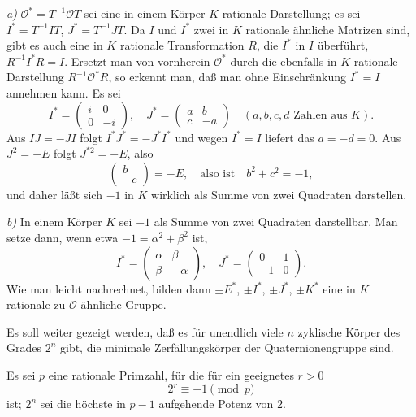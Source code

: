 \documentclass[12pt,a4paper]{article}
\theoremstyle{definition}
\begin{document}
\smallskip

\textit{a)} $\mathcal{O}^* = T^{-1}\mathcal{O}T$ sei eine in einem K\"orper $K$
rationale Darstellung; es sei $I^* = T^{-1}IT$, $J^* = T^{-1}JT$. Da $I$
und $I^*$ zwei in $K$ rationale \"ahnliche Matrizen sind, gibt es auch eine
in $K$ rationale Transformation $R$, die $I^*$ in $I$ \"uberf\"uhrt,
$R^{-1}I^*R = I$. Ersetzt man von vornherein $\mathcal{O}^*$ durch die
ebenfalls in $K$ rationale Darstellung $R^{-1}\mathcal{O}^*R$, so erkennt
man, da\ss{} man ohne Einschr\"ankung $I^* = I$ annehmen kann. Es sei
\[
I^* = \begin{pmatrix} i&0\\0&-i \end{pmatrix}, \quad
J^* = \begin{pmatrix} a&b\\c&-a \end{pmatrix}
\quad (a,b,c,d \text{ Zahlen aus } K).
\]
Aus $IJ = -JI$ folgt $I^*J^* = -J^*I^*$ und wegen $I^* = I$ liefert das
$a = -d = 0$. Aus $J^2 = -E$ folgt $J^{*2} = -E$, also
\[
\begin{pmatrix} b\\-c \end{pmatrix} = -E,
\quad\text{also ist}\quad
b^2 + c^2 = -1,
\]
und daher l\"a\ss t sich $-1$ in $K$ wirklich als Summe von zwei Quadraten
darstellen.

\smallskip

\textit{b)} In einem K\"orper $K$ sei $-1$ als Summe von zwei Quadraten
darstellbar. Man setze dann, wenn etwa $-1 = \alpha^2 + \beta^2$ ist,
\[
I^* = \begin{pmatrix} \alpha & \beta \\ \beta & -\alpha \end{pmatrix}, \quad
J^* = \begin{pmatrix} 0 & 1 \\ -1 & 0 \end{pmatrix}.
\]
Wie man leicht nachrechnet, bilden dann $\pm E^*$, $\pm I^*$, $\pm J^*$,
$\pm K^*$ eine in $K$ rationale zu $\mathcal{O}$ \"ahnliche Gruppe.

\smallskip

Es soll weiter gezeigt werden, da\ss{} es f\"ur unendlich viele $n$ zyklische
K\"orper des Grades $2^n$ gibt, die minimale Zerf\"allungsk\"orper der
Quaternionengruppe sind.

Es sei $p$ eine rationale Primzahl, f\"ur die f\"ur ein geeignetes $r > 0$
\[
2^r \equiv -1 \pmod{p}
\]
ist; $2^n$ sei die h\"ochste in $p-1$ aufgehende Potenz von $2$.
\end{document}
